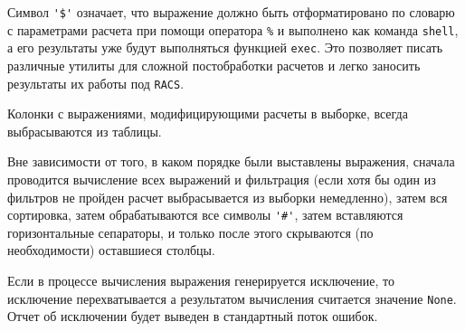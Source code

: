 Символ \verb|'$'| означает, что 
выражение должно быть отформатировано по словарю с параметрами расчета при помощи оператора \verb'%' и выполнено как команда \verb'shell',
а его результаты уже будут выполняться функцией \verb'exec'. Это позволяет писать различные утилиты для сложной постобработки расчетов и
легко заносить результаты их работы под \verb'RACS'.

Колонки с выражениями, модифицирующими расчеты в выборке, всегда выбрасываются из таблицы.

Вне зависимости от того, в каком порядке были выставлены выражения,
сначала проводится вычисление всех выражений и фильтрация (если хотя бы один из фильтров не пройден расчет выбрасывается из выборки немедленно),
затем вся сортировка, затем обрабатываются все символы \verb|'#'|, затем вставляются горизонтальные сепараторы,
и только после этого скрываются (по необходимости) оставшиеся столбцы.

Если в процессе вычисления выражения генерируется исключение, то исключение перехватывается а результатом вычисления считается значение \verb'None'.
Отчет об исключении будет выведен в стандартный поток ошибок.

